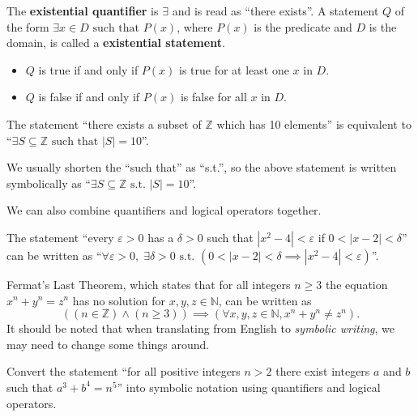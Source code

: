 \begin{definition}
    The \textbf{existential quantifier} is $\exists$ and is read as ``there exists''. A statement $Q$ of the form $\exists x \in D \textrm{ such that } P(x)$, where $P(x)$ is the predicate and $D$ is the domain, is called a \textbf{existential statement}.
    \begin{itemize}
        \item $Q$ is true if and only if $P(x)$ is true for at least one $x$ in $D$.
        \item $Q$ is false if and only if $P(x)$ is false for all $x$ in $D$.
    \end{itemize}
\end{definition}
\begin{example}
    The statement ``there exists a subset of $\mathbb{Z}$ which has 10 elements'' is equivalent to ``$\exists S \subseteq \mathbb{Z} \text{ such that } |S| = 10$''.
\end{example}
\begin{remark}
    We usually shorten the ``such that'' as ``s.t.'', so the above statement is written symbolically as ``$\exists S \subseteq \mathbb{Z} \text{ s.t. } |S| = 10$''.
\end{remark}

We can also combine quantifiers and logical operators together.
\begin{example}
    The statement ``every $\varepsilon > 0$ has a $\delta > 0$ such that $|x^2 - 4| < \varepsilon$ if $0 < |x - 2| < \delta$'' can be written as ``$\forall \varepsilon > 0,\;\exists \delta > 0 \text{ s.t. } (0 < |x - 2| < \delta \implies |x^2 - 4| < \varepsilon)$''.
\end{example}
\begin{example}
    Fermat's Last Theorem, which states that for all integers $n\geq 3$ the equation $x^n + y^n = z^n$ has no solution for $x, y, z \in \mathbb{N}$, can be written as
    \[
        \left((n \in \mathbb{Z}) \land (n \geq 3)\right) \implies \left(\forall x, y, z \in \mathbb{N}, x^n + y^n \neq z^n\right).
    \]
    It should be noted that when translating from English to \textit{symbolic writing}, we may need to change some things around.
\end{example}

\begin{exercise}
    Convert the statement ``for all positive integers $n > 2$ there exist integers $a$ and $b$ such that $a^3 + b^4 = n^5$'' into symbolic notation using quantifiers and logical operators.
\end{exercise}

